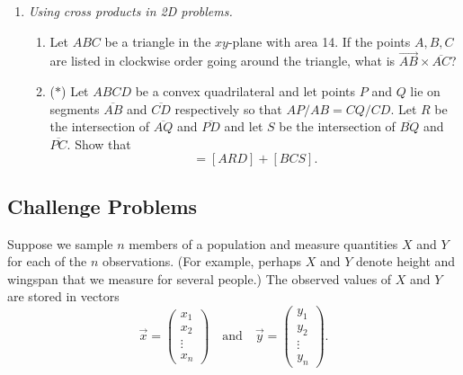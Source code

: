 \begin{enumerate}
\begin{enumerate}
\end{enumerate}
\item \emph{Using cross products in 2D problems.}
\begin{enumerate}
\item Let $ABC$ be a triangle in the $xy$-plane with area 14. If the points $A,B,C$ are listed in clockwise order going around the triangle, what is $\overrightarrow{AB}\times\overline{AC}$?
\item ($*$) Let $ABCD$ be a convex quadrilateral and let points $P$ and $Q$ lie on segments $\overline{AB}$ and $\overline{CD}$ respectively so that $AP/AB = CQ/CD$. Let $R$ be the intersection of $\overline{AQ}$ and $\overline{PD}$ and let $S$ be the intersection of $\overline{BQ}$ and $\overline{PC}$. Show that
\begin{equation*}
[PSQR] = [ARD] + [BCS].
\end{equation*}
\end{enumerate}
\end{enumerate}


\newpage
\subsection{Challenge Problems}

Suppose we sample $n$ members of a population and measure quantities $X$ and $Y$ for each of the $n$ observations. (For example, perhaps $X$ and $Y$ denote height and wingspan that we measure for several people.) The observed values of $X$ and $Y$ are stored in vectors
\begin{equation*}
\vec{x} = \begin{pmatrix} x_1 \\ x_2 \\ \vdots \\ x_n \end{pmatrix}\quad\text{and}\quad\vec{y} = \begin{pmatrix} y_1 \\ y_2 \\ \vdots \\ y_n \end{pmatrix}.
\end{equation*}

